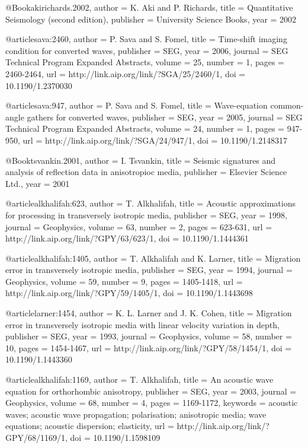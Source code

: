 {@Book{akirichards.2002,
  author =	 {K. Aki and P. Richards},
  title =	 {Quantitative Seismology (second edition)},
  publisher =	 {University Science Books},
  year =	 2002
}

@article{sava:2460,
  author =	 {P. Sava and S. Fomel},
  title =	 {Time-shift imaging condition for converted waves},
  publisher =	 {SEG},
  year =	 2006,
  journal =	 {SEG Technical Program Expanded Abstracts},
  volume =	 25,
  number =	 1,
  pages =	 {2460-2464},
  url =		 {http://link.aip.org/link/?SGA/25/2460/1},
  doi =		 {10.1190/1.2370030}
}

@article{sava:947,
  author =	 {P. Sava and S. Fomel},
  title =	 {Wave-equation common-angle gathers for converted
                  waves},
  publisher =	 {SEG},
  year =	 2005,
  journal =	 {SEG Technical Program Expanded Abstracts},
  volume =	 24,
  number =	 1,
  pages =	 {947-950},
  url =		 {http://link.aip.org/link/?SGA/24/947/1},
  doi =		 {10.1190/1.2148317}
}

@Book{tsvankin.2001,
  author =	 {I. Tsvankin},
  title =	 {Seismic signatures and analysis of reflection data
                  in anisotropioc media},
  publisher =	 {Elsevier Science Ltd.},
  year =	 2001
}

@article{alkhalifah:623,
  author =	 {T. Alkhalifah},
  title =	 {Acoustic approximations for processing in
                  transversely isotropic media},
  publisher =	 {SEG},
  year =	 1998,
  journal =	 {Geophysics},
  volume =	 63,
  number =	 2,
  pages =	 {623-631},
  url =		 {http://link.aip.org/link/?GPY/63/623/1},
  doi =		 {10.1190/1.1444361}
}

@article{alkhalifah:1405,
  author =	 {T. Alkhalifah and K. Larner},
  title =	 {Migration error in transversely isotropic media},
  publisher =	 {SEG},
  year =	 1994,
  journal =	 {Geophysics},
  volume =	 59,
  number =	 9,
  pages =	 {1405-1418},
  url =		 {http://link.aip.org/link/?GPY/59/1405/1},
  doi =		 {10.1190/1.1443698}
}

@article{larner:1454,
  author =	 {K. L. Larner and J. K. Cohen},
  title =	 {Migration error in transversely isotropic media with
                  linear velocity variation in depth},
  publisher =	 {SEG},
  year =	 1993,
  journal =	 {Geophysics},
  volume =	 58,
  number =	 10,
  pages =	 {1454-1467},
  url =		 {http://link.aip.org/link/?GPY/58/1454/1},
  doi =		 {10.1190/1.1443360}
}

@article{alkhalifah:1169,
  author =	 {T. Alkhalifah},
  title =	 {An acoustic wave equation for orthorhombic
                  anisotropy},
  publisher =	 {SEG},
  year =	 2003,
  journal =	 {Geophysics},
  volume =	 68,
  number =	 4,
  pages =	 {1169-1172},
  keywords =	 {acoustic waves; acoustic wave propagation;
                  polarisation; anisotropic media; wave equations;
                  acoustic dispersion; elasticity},
  url =		 {http://link.aip.org/link/?GPY/68/1169/1},
  doi =		 {10.1190/1.1598109}
}

}
